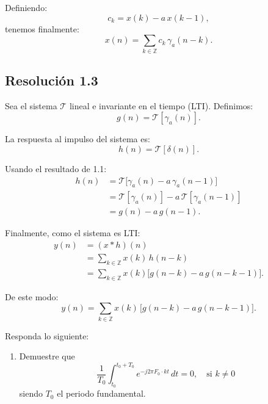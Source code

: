 \documentclass[
  11pt,
  letterpaper,
   addpoints,
   answers
  ]{exam}
\begin{document}
\begin{questions}
\begin{solution}
Definiendo:
\begin{equation}
c_k = x(k) - a\,x(k-1),
\end{equation}
tenemos finalmente:
\begin{equation}
x(n) = \sum_{k \in \mathbb{Z}} c_k\,\gamma_a(n-k).
\end{equation}

\subsection*{Resolución 1.3}
Sea el sistema \( \mathcal{T} \) lineal e invariante en el tiempo (LTI). Definimos:
\begin{equation}
g(n) = \mathcal{T}[\gamma_a(n)].
\end{equation}

La respuesta al impulso del sistema es:
\begin{equation}
h(n) = \mathcal{T}[\delta(n)].
\end{equation}

Usando el resultado de 1.1:
\begin{align}
h(n) &= \mathcal{T}\big[\gamma_a(n) - a\,\gamma_a(n-1)\big] \\
&= \mathcal{T}[\gamma_a(n)] - a\,\mathcal{T}[\gamma_a(n-1)] \\
&= g(n) - a\,g(n-1).
\end{align}

Finalmente, como el sistema es LTI:
\begin{align}
y(n) &= (x * h)(n) \\
&= \sum_{k \in \mathbb{Z}} x(k)\,h(n-k) \\
&= \sum_{k \in \mathbb{Z}} x(k)\Big[g(n-k) - a\,g(n-k-1)\Big].
\end{align}

De este modo:
\begin{equation}
y(n) = \sum_{k \in \mathbb{Z}} x(k)\,\big[g(n-k) - a\,g(n-k-1)\big].
\end{equation}

\end{solution}

\question Responda lo siguiente:
\begin{enumerate}
  \item Demuestre que
  \begin{equation}
    \frac{1}{T_0} \int_{t_0}^{t_0+T_0} e^{-j 2\pi F_0 \cdot k t} \, dt = 0, \quad \text{si } k \neq 0
  \end{equation}
  siendo $T_0$ el periodo fundamental.


\end{enumerate}
\end{questions}
\end{document}
